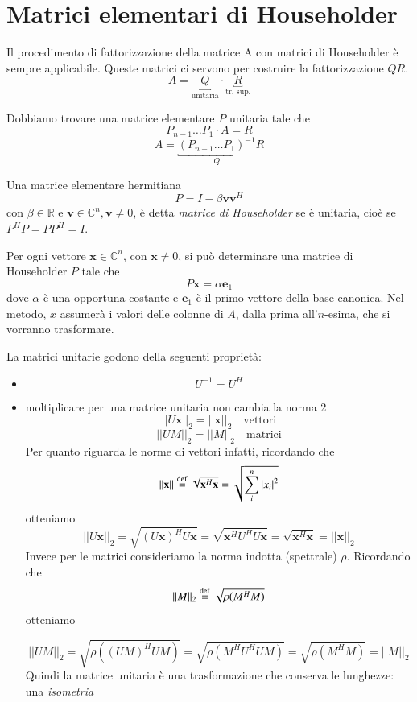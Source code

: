 \section{Matrici elementari di Householder}
\label{sec:householder}
Il procedimento di fattorizzazione della matrice A con matrici di
Householder \`e sempre applicabile. Queste matrici ci servono per
costruire la fattorizzazione $QR$.
$$ A = \underbracket{Q}_{\text{unitaria}}\cdot\underbracket{R}_{\text{tr. sup.}} $$

Dobbiamo trovare una matrice elementare  $P$ unitaria tale che
$$ P_{n-1} \ldots P_{1} \cdot A = R$$
$$ A = \underbracket{(P_{n-1}\ldots P_{1})^{-1}}_{Q}R $$

\begin{defn}
  Una matrice elementare hermitiana
  $$ P = I - \beta \mathbf{\mathbf{v} \mathbf{v}}^H $$
  con $\beta \in \mathbb{R}$ e $\mathbf{v} \in \mathbb{C}^n,\mathbf{v} \neq 0$, \`e detta
  \emph{matrice di Householder} se \`e unitaria, cio\`e se $P^H P = P P^H = I$.
\end{defn}

Per ogni vettore $\mathbf{x} \in \mathbb{C}^n$, con $\mathbf{x} \neq 0$, si può
determinare una matrice di Householder $P$ tale che 
 $$ P\mathbf{x} = \alpha \mathbf{e}_1 $$ 
dove $\alpha$ \`e una opportuna costante e $\mathbf{e}_1$ \`e il primo vettore della base canonica. Nel metodo, $x$ assumerà i valori delle colonne di $A$, dalla prima all'$n$-esima, che si vorranno trasformare.

\begin{property}
  La matrici unitarie godono della seguenti propriet\`a:
  \begin{itemize}
  \item $$ U^{-1} = U^{H}$$
  \item moltiplicare per una matrice unitaria non cambia la norma 2
    $$ || U\mathbf{x} ||_{2} = || \mathbf{x} ||_{2} \quad \text{vettori}$$
    $$ || UM ||_{2} = || M ||_{2} \quad \text{matrici}$$
    Per quanto riguarda le norme di vettori infatti,
    ricordando che 
    $$||\mathbf{x}|| \defeq \sqrt{\mathbf{x}^{H}\mathbf{x}} =
    \sqrt{\displaystyle \sum_{i}^{n} |x_i|^{2}}$$
    otteniamo
    $$ || U\mathbf{x} ||_{2} = \sqrt{(U\mathbf{x})^{H} U\mathbf{x}} =
    \sqrt{\mathbf{x}^{H}U^{H}U\mathbf{x}} = \sqrt{\mathbf{x}^{H}\mathbf{x}} =
    ||\mathbf{x}||_{2}$$
    Invece per le matrici consideriamo la norma indotta (spettrale) $\rho$.
    Ricordando che
    $$||M||_2 \defeq \sqrt{\rho(M^{H}M)}$$
    otteniamo

    $$ || UM ||_{2} = \sqrt{\rho\left((UM)^{H} UM \right)} = \sqrt{\rho(M^{H}U^{H}UM)} = \sqrt{\rho(M^{H}M)} = ||M||_{2} $$
    Quindi la matrice unitaria \`e una trasformazione che conserva le lunghezze:
    una \emph{isometria}
\end{itemize}
\end{property}

